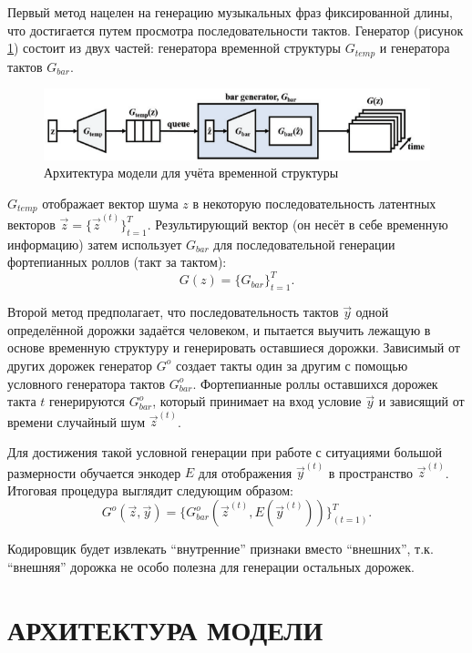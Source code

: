     Первый метод нацелен на генерацию музыкальных фраз фиксированной длины, что 
    достигается путем просмотра последовательности тактов. Генератор (рисунок \ref{fig:model_architecture}) состоит из двух частей: генератора временной структуры $G_{temp}$ и генератора тактов $G_{bar}$.
    
    \begin{figure}[h]
        \centering
        \includegraphics[scale=0.7]{tex/png/architecture_from_stratch.png}
        \caption{Архитектура модели для учёта временной структуры \cite{musegan}}
        \label{fig:model_architecture}
    \end{figure}
    
    $G_{temp}$ отображает вектор шума $z$ в некоторую последовательность латентных векторов $\vec{z} = \{ \vec{z}^{(t)} \} ^ T _ {t=1}$. Результирующий вектор (он несёт в себе временную информацию) затем использует $G_{bar}$ для последовательной генерации фортепианных роллов (такт за тактом):
    $$ G(z) = \{ G_{bar} \} ^ T _ {t=1}. $$
    
    Второй метод предполагает, что последовательность тактов $\vec{y}$ одной определённой дорожки задаётся человеком, и пытается выучить лежащую в основе временную структуру и генерировать оставшиеся дорожки. Зависимый от других дорожек генератор $G^{o}$ создает такты один за другим с помощью условного генератора тактов $G^o_{bar}$. Фортепианные роллы оставшихся дорожек такта $t$ генерируются $G^o_{bar}$, который принимает на вход условие $\vec{y}$ и зависящий от времени случайный шум ${\vec{z}} ^ {(t)}$.
    
    Для достижения такой условной генерации при работе с ситуациями большой размерности обучается энкодер $E$ для отображения $\vec{y}^{(t)}$ в пространство $\vec{z}^{(t)}$. Итоговая процедура выглядит следующим образом:
    $$ G^o(\vec{z}, \vec{y}) = \{G^o_{bar}(\vec{z}^{(t)}, E(\vec{y}^{(t)}))\}^T_{(t=1)}. $$
    
    Кодировщик будет извлекать “внутренние” признаки вместо “внешних”, т.к. “внешняя” дорожка не особо полезна для генерации остальных дорожек.

\section{АРХИТЕКТУРА МОДЕЛИ}
    
